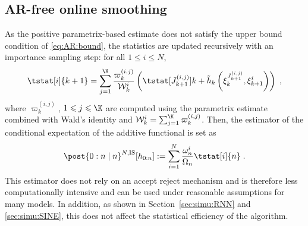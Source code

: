 \documentclass{article}
\newcommand{\af}[1]{h_{#1}}
\newcommand{\addf}[1]{\termletter_{#1}}
\newcommand{\termletter}{\tilde{h}}
\newcommand{\N}{N}
\newcommand{\hkup}{\bar{\varepsilon}}
\newcommand{\bi}[3]{J_{#1}^{(#2, #3)}}
\newcommand{\eqdef}{\ensuremath{:=}}
\newcommand{\eqsp}{\;}
\newcommand{\ewght}[2]{\ensuremath{\omega_{#1}^{#2}}}
\newcommand{\epart}[2]{\ensuremath{\xi_{#1}^{#2}}}
\newcommand{\sumwght}[2][]{%
\ifthenelse{\equal{#1}{}}{\ensuremath{\Omega_{#2}}}{\ensuremath{\Omega_{#2}^{(#1)}}}}
\newcommand{\kernelmarg}{\mathbf{R}}
\newcommand{\hatqg}[1]{\mathsf{\ell}_{#1}}
\begin{document}
\subsection{AR-free online smoothing}
As the positive parametrix-based estimate does not satisfy the upper bound condition of \eqref{eq:AR:bound}, the statistics are updated recursively with an importance sampling step: for all $1\leqslant i\leqslant \N$,
\begin{equation}
\label{eq:update:paris:marginal:is}
\tstat[i]{k+1} =\sum_{j=1}^{\K}\frac{\varpi_k^{(i,j)}}{\mathcal{W}_k^i}\left( \tstat[\bi{k+1}{i}{j}]{k} + \addf{k}\left(\epart{k}{\bi{k+1}{i}{j}}, \epart{k+1}{i}\right)\right)\eqsp,
\end{equation}
where $\varpi_k^{(i,j)}$, $1\leqslant j \leqslant \K$ are computed using the parametrix estimate combined with Wald's identity and $\mathcal{W}_k^i = \sum_{j=1}^{\K} \varpi_k^{(i,j)}$.
Then, the estimator of the conditional expectation of the additive functional is set as
\[
\post{0:n\mid n}^{\N,\textrm{IS}} [\af{0:n}] \eqdef \sum_{i=1}^{\N}\frac{\ewght{n}{i}}{\sumwght{n}}\tstat[i]{n}\eqsp.
\]
This estimator does not rely on an accept reject mechanism and is therefore less computationally intensive and can be used under reasonable assumptions for many models. 
In addition, as shown in Section~\ref{sec:simu:RNN} and \ref{sec:simu:SINE}, this does not affect the statistical efficiency of the algorithm.
\end{document}
